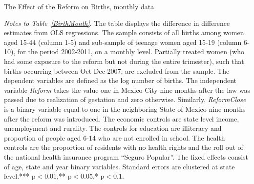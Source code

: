 \documentclass[a4paper, 11pt]{article}
\begin{document}
\begin{spacing}{1.4}
\begin{table}\caption{The Effect of the Reform on Births, monthly data} \label{BirthMonth}	
  \begin{threeparttable}
    {\footnotesize  }
    \begin{tablenotes}
      \footnotesize
    \item \textit{Notes to Table~\ref{BirthMonth}}. The table displays the difference in difference estimates from OLS regressions. The sample consists of all births among women aged 15-44 (column 1-5) and sub-sample of teenage women aged 15-19 (column 6-10), for the period 2002-2011, on a monthly level. Partially treated women (who had some exposure to the reform but not during the entire trimester), such that births occurring between Oct-Dec 2007, are excluded from the sample. The dependent variables are defined as the log number of births. The independent variable \textit{Reform} takes the value one in Mexico City nine months after the law was passed due to realization of gestation and zero otherwise. Similarly, \textit{ReformClose} is a binary variable equal to one in the neighboring State of Mexico nine months after the reform was introduced. The economic controls are state level income, unemployment and rurality. The controls for education are illiteracy and proportion of people aged 6-14 who are not enrolled in school. The health controls are the proportion of residents with no health rights and the roll out of the national health insurance program ``Seguro Popular''. The fixed effects consist of age, state and year binary variables. Standard errors are clustered at state level.*** p$<$0.01,** p$<$0.05,* p$<$0.1.
    \end{tablenotes} 
  \end{threeparttable}
\end{table}


\end{spacing}
\end{document}
